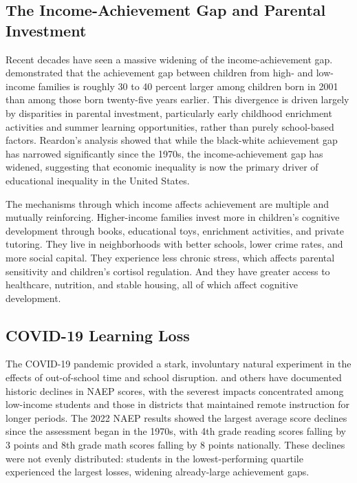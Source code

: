 \documentclass[12pt,letterpaper]{article}
\begin{document}
\subsection{The Income-Achievement Gap and Parental Investment}

Recent decades have seen a massive widening of the income-achievement gap. \citet{reardon2011} demonstrated that the achievement gap between children from high- and low-income families is roughly 30 to 40 percent larger among children born in 2001 than among those born twenty-five years earlier. This divergence is driven largely by disparities in parental investment, particularly early childhood enrichment activities and summer learning opportunities, rather than purely school-based factors. Reardon's analysis showed that while the black-white achievement gap has narrowed significantly since the 1970s, the income-achievement gap has widened, suggesting that economic inequality is now the primary driver of educational inequality in the United States.

The mechanisms through which income affects achievement are multiple and mutually reinforcing. Higher-income families invest more in children's cognitive development through books, educational toys, enrichment activities, and private tutoring. They live in neighborhoods with better schools, lower crime rates, and more social capital. They experience less chronic stress, which affects parental sensitivity and children's cortisol regulation. And they have greater access to healthcare, nutrition, and stable housing, all of which affect cognitive development.

\subsection{COVID-19 Learning Loss}

The COVID-19 pandemic provided a stark, involuntary natural experiment in the effects of out-of-school time and school disruption. \citet{goldhaber2022} and others have documented historic declines in NAEP scores, with the severest impacts concentrated among low-income students and those in districts that maintained remote instruction for longer periods. The 2022 NAEP results showed the largest average score declines since the assessment began in the 1970s, with 4th grade reading scores falling by 3 points and 8th grade math scores falling by 8 points nationally. These declines were not evenly distributed: students in the lowest-performing quartile experienced the largest losses, widening already-large achievement gaps.
\end{document}
